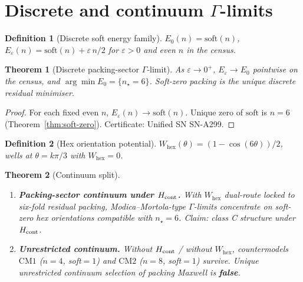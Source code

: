 \documentclass[11pt,a4paper]{article}
\newtheorem{theorem}{Theorem}
\newtheorem{definition}{Definition}
\theoremstyle{remark}
\begin{document}
\section{Discrete and continuum $\Gamma$-limits}
\label{sec:gamma}

\begin{definition}[Discrete soft energy family]
\label{def:Eeps}
$E_0(n)=\mathrm{soft}(n)$, $E_\varepsilon(n)=\mathrm{soft}(n)+\varepsilon\, n/2$ for $\varepsilon>0$ and even $n$ in the census.
\end{definition}

\begin{theorem}[Discrete packing-sector $\Gamma$-limit]
\label{thm:Gdisc}
As $\varepsilon\to 0^+$, $E_\varepsilon\to E_0$ pointwise on the census, and
$\arg\min E_0=\{n_\star=6\}$. Soft-zero packing is the unique discrete residual minimiser.
\end{theorem}

\begin{proof}
For each fixed even $n$, $E_\varepsilon(n)\to\mathrm{soft}(n)$. Unique zero of $\mathrm{soft}$ is $n=6$ (Theorem~\ref{thm:soft-zero}). Certificate: Unified SN SN-A299.
\end{proof}

\begin{definition}[Hex orientation potential]
\label{def:Whex}
$W_{\mathrm{hex}}(\theta)=(1-\cos(6\theta))/2$, wells at $\theta=k\pi/3$ with $W_{\mathrm{hex}}=0$.
\end{definition}

\begin{theorem}[Continuum split]
\label{thm:Gcont}
\begin{enumerate}[label=(\roman*)]
\item \textbf{Packing-sector continuum under $H_{\rm cont}$.} With $W_{\mathrm{hex}}$ dual-route locked to six-fold residual packing, Modica--Mortola-type $\Gamma$-limits concentrate on soft-zero hex orientations compatible with $n_\star=6$. Claim: class C structure under $H_{\rm cont}$.
\item \textbf{Unrestricted continuum.} Without $H_{\rm cont}$ / without $W_{\mathrm{hex}}$, countermodels $\mathrm{CM1}$ ($n=4$, soft$=1$) and $\mathrm{CM2}$ ($n=8$, soft$=1$) survive. Unique unrestricted continuum selection of packing Maxwell is \textbf{false}.
\end{enumerate}
\end{theorem}
\end{document}
